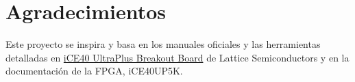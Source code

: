 \section{Agradecimientos}
Este proyecto se inspira y basa en los manuales oficiales y las herramientas detalladas en \href{http://www.latticesemi.com/en/Products/DevelopmentBoardsAndKits/iCE40UltraPlusBreakoutBoard.aspx}{iCE40 UltraPlus Breakout Board} de Lattice Semiconductors y en la documentación de la FPGA, iCE40UP5K.